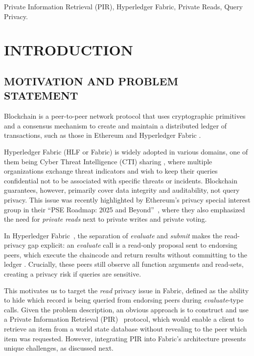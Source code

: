 \documentclass{ieeetj}
\begin{document}
\begin{IEEEkeywords}
    Private Information Retrieval (PIR), Hyperledger Fabric, Private Reads, Query Privacy.
\end{IEEEkeywords}


\maketitle
\section{INTRODUCTION}\label{sec:introduction}

\subsection{MOTIVATION AND PROBLEM STATEMENT}
Blockchain \cite{nakamoto_bitcoin_2008} is a peer-to-peer network protocol that uses cryptographic primitives and 
a consensus mechanism to create and maintain a distributed ledger of transactions, such as those in Ethereum \cite{wood_ethereum_2014} and 
Hyperledger Fabric \cite{androulaki_hyperledger_2018}.

Hyperledger Fabric (HLF or Fabric) is widely adopted in various domains, one of them being Cyber Threat Intelligence (CTI) sharing
\cite{dunnett_trusted_2022, huff_distributed_2021, allouche_trade_2021, gong_blocis_2020}, where multiple organizations 
exchange threat indicators and wish to keep their queries confidential not to be associated with specific threats or incidents.
Blockchain guarantees, however, primarily cover data integrity and auditability, not query privacy.
This issue was recently highlighted by Ethereum's privacy special interest group in their
``PSE Roadmap: 2025 and Beyond''~\cite{ethereum_pse_2025}, where they also 
emphasized the need for \emph{private reads} next to private writes and private voting.

In Hyperledger Fabric~\cite{androulaki_hyperledger_2018}, the separation of \emph{evaluate} and \emph{submit} 
makes the read-privacy gap explicit: an \emph{evaluate} call is a read-only proposal sent to endorsing peers, 
which execute the chaincode and return results without committing to the ledger \cite{fabric_docs_a_nodate}.
Crucially, these peers still observe all function arguments and read-sets, creating a privacy risk if queries are sensitive.

This motivates us to target the \emph{read} privacy issue in Fabric, defined as the ability to 
hide which record is being queried from endorsing peers during \emph{evaluate}-type calls. 
Given the problem description, an obvious approach is to construct and use a Private Information Retrieval (PIR)~\cite{chor_private_1998} 
protocol, which would enable a client to retrieve an item from a world state database without revealing to the peer which item was requested. 
However, integrating PIR into Fabric's architecture presents unique challenges, as discussed next.
\end{document}
